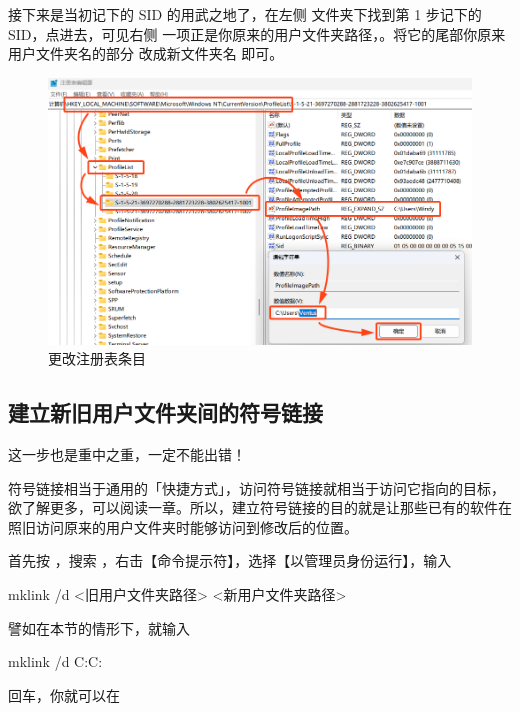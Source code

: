 {{{{接下来是当初记下的 SID 的用武之地了，在左侧  文件夹下找到第 1 步记下的 SID，点进去，可见右侧  一项正是你原来的用户文件夹路径，。将它的尾部你原来用户文件夹名的部分  改成新文件夹名  即可。

\begin{figure}[htb!]
  \centering
  \includegraphics[width=.7\textwidth]{assets/advanced/Change_Reg.png}
  \caption{更改注册表条目}
  \label{fig:Change_Reg}
\end{figure}

\subsection{建立新旧用户文件夹间的符号链接}

\begin{dangerbox}
  这一步也是重中之重，一定不能出错！
\end{dangerbox}

符号链接相当于通用的「快捷方式」，访问符号链接就相当于访问它指向的目标，欲了解更多，可以阅读一章。所以，建立符号链接的目的就是让那些已有的软件在照旧访问原来的用户文件夹时能够访问到修改后的位置。

首先按 ，搜索 ，右击【命令提示符】，选择【以管理员身份运行】，输入
\begin{MissingVerbatim}
  mklink /d <旧用户文件夹路径> <新用户文件夹路径>
\end{MissingVerbatim}
譬如在本节的情形下，就输入
\begin{MissingVerbatim}
  mklink /d C:\Users\Windy C:\Users\Ventus
\end{MissingVerbatim}
回车，你就可以在 }}}}
